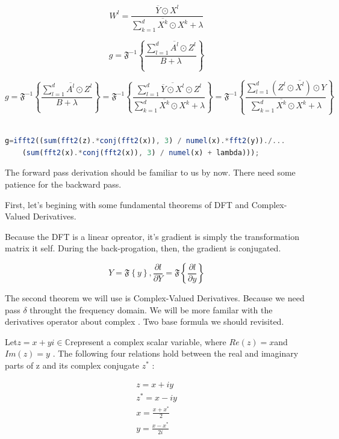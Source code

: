 \documentclass[11pt]{article}
\begin{document}
$$
W^{l}=\frac{\overline{Y} \odot X^{l}}{\sum_{k=1}^{d}\overline{X^{k}} \odot X^{k}+\lambda}
$$


$$
g=\mathfrak{F}^{-1}\left\{ \frac{\sum_{l=1}^{d}\overline{A^{l}} \odot Z^{l}}{B+\lambda}\right\}
$$

$$
g=\mathfrak{F}^{-1}\left\{ \frac{\sum_{l=1}^{d}\overline{A^{l}} \odot Z^{l}}{B+\lambda}\right\} 
=\mathfrak{F}^{-1}\left\{\frac{ \sum_{l=1}^{d}\overline{\overline{Y} \odot X^{l}} \odot Z^{l}}{\sum_{k=1}^{d}\overline{X^{k}} \odot X^{k}+\lambda}\right\} 
=\mathfrak{F}^{-1}\left\{\frac{ \sum_{l=1}^{d}(Z^{l} \odot \overline{X^{l}}) \odot Y}{\sum_{k=1}^{d}\overline{X^{k}} \odot X^{k}+\lambda}\right\}
$$


\begin{lstlisting}[language=Octave]

g=ifft2((sum(fft2(z).*conj(fft2(x)), 3) / numel(x).*fft2(y))./...
	(sum(fft2(x).*conj(fft2(x)), 3) / numel(x) + lambda)));

\end{lstlisting}

The forward pass derivation should be familiar to us by now. There need some 
patience for the backward pass.

First, let's begining with  some fundamental theorems of DFT and Complex-Valued Derivatives.

Because the DFT is a linear opreator, it's gradient is simply the transformation matrix it self. During the back-progation, then, the gradient is conjugated.\cite{SpectralPool}

$$
Y=\mathfrak{F}\left\{y\right\},\frac{\partial l}{\partial Y} = \mathfrak{F}\left\{\frac{\partial l}{\partial y}\right\}
$$


The second theorem we will use is Complex-Valued Derivatives\cite{Complexderivatives}. Because we need pass $\delta$ throught the frequency domain. We will be more familar with the derivatives operator about complex . Two base formula we should revisited.

Let$ z = x + yi \in \mathbb {C} $represent a complex scalar variable, where $ Re(z) = x $and $ Im(z) = y $ . The following four relations hold between the real and imaginary parts of z and its complex conjugate $ z^{*}$ :

\begin{eqnarray*}
z = x + iy\\
z^{*} = x - iy\\
x = \frac{x+x^{*}}{2}\\
y = \frac{x-x^{*}}{2i}
\end{eqnarray*}
\end{document}
